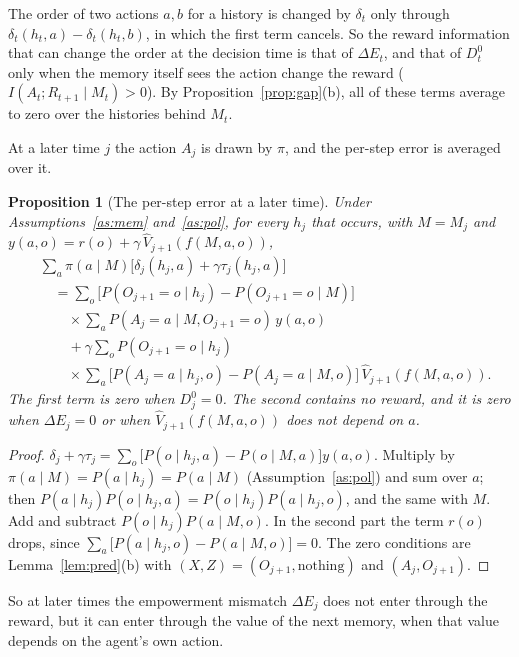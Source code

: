 \documentclass{article}
\newtheorem{proposition}{Proposition}[section]
\theoremstyle{definition}
\theoremstyle{remark}
\newcommand{\dE}{\Delta E}
\begin{document}
The order of two actions $a,b$ for a history is changed by $\delta_t$ only through $\delta_t(h_t,a)-\delta_t(h_t,b)$, in which the first term cancels. So the reward information that can change the order at the decision time is that of $\dE_t$, and that of $D^0_t$ only when the memory itself sees the action change the reward ($I(A_t;R_{t+1}\mid M_t)>0$). By Proposition~\ref{prop:gap}(b), all of these terms average to zero over the histories behind $M_t$.

At a later time $j$ the action $A_j$ is drawn by $\pi$, and the per-step error is averaged over it.

\begin{proposition}[The per-step error at a later time]\label{prop:future}
Under Assumptions~\ref{as:mem} and~\ref{as:pol}, for every $h_j$ that occurs, with $M=M_j$ and $y(a,o)=r(o)+\gamma\,\hat V_{j+1}(f(M,a,o))$,
\begin{align*}
&\sum_a\pi(a\mid M)\big[\delta_j(h_j,a)+\gamma\tau_j(h_j,a)\big]\\
&\quad=\sum_o\big[P(O_{j+1}=o\mid h_j)-P(O_{j+1}=o\mid M)\big]\\
&\qquad\times\sum_aP(A_j=a\mid M,O_{j+1}=o)\,y(a,o)\\
&\qquad+\gamma\sum_oP(O_{j+1}=o\mid h_j)\\
&\qquad\times\sum_a\big[P(A_j=a\mid h_j,o)-P(A_j=a\mid M,o)\big]\,\hat V_{j+1}(f(M,a,o)).
\end{align*}
The first term is zero when $D^0_j=0$. The second contains no reward, and it is zero when $\dE_j=0$ or when $\hat V_{j+1}(f(M,a,o))$ does not depend on $a$.
\end{proposition}

\begin{proof}
$\delta_j+\gamma\tau_j=\sum_o\big[P(o\mid h_j,a)-P(o\mid M,a)\big]y(a,o)$. Multiply by $\pi(a\mid M)=P(a\mid h_j)=P(a\mid M)$ (Assumption~\ref{as:pol}) and sum over $a$; then $P(a\mid h_j)P(o\mid h_j,a)=P(o\mid h_j)P(a\mid h_j,o)$, and the same with $M$. Add and subtract $P(o\mid h_j)P(a\mid M,o)$. In the second part the term $r(o)$ drops, since $\sum_a\big[P(a\mid h_j,o)-P(a\mid M,o)\big]=0$. The zero conditions are Lemma~\ref{lem:pred}(b) with $(X,Z)=(O_{j+1},\text{nothing})$ and $(A_j,O_{j+1})$.
\end{proof}

So at later times the empowerment mismatch $\dE_j$ does not enter through the reward, but it can enter through the value of the next memory, when that value depends on the agent's own action.
\end{document}
